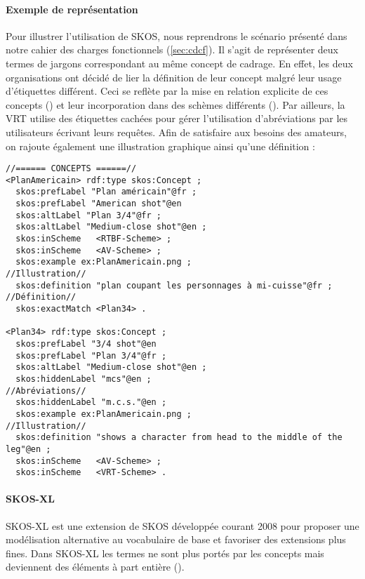 \paragraph{Exemple de représentation} 
Pour illustrer l'utilisation de SKOS, nous reprendrons le scénario présenté dans notre cahier des charges fonctionnels (\ref{sec:cdcf}). 
Il s'agit de représenter deux termes de jargons correspondant au même concept de cadrage.
En effet, les deux organisations ont décidé de lier la définition de leur concept malgré leur usage d'étiquettes différent. 
Ceci se reflète par la mise en relation explicite de ces concepts () et leur incorporation dans des schèmes différents ().
Par ailleurs, la VRT utilise des étiquettes cachées pour gérer l'utilisation d'abréviations par les utilisateurs écrivant leurs requêtes. 
Afin de satisfaire aux besoins des amateurs, on rajoute également une illustration graphique ainsi qu'une définition :
\begin{Verbatim}[fontsize=\small,formatcom=\color{black!70}]
//====== CONCEPTS ======//
<PlanAmericain> rdf:type skos:Concept ; 
  skos:prefLabel "Plan américain"@fr ;
  skos:prefLabel "American shot"@en
  skos:altLabel "Plan 3/4"@fr ;
  skos:altLabel "Medium-close shot"@en ;
  skos:inScheme   <RTBF-Scheme> ;
  skos:inScheme   <AV-Scheme> ;
  skos:example ex:PlanAmericain.png ;                               //Illustration//
  skos:definition "plan coupant les personnages à mi-cuisse"@fr ;   //Définition//
  skos:exactMatch <Plan34> .
   
<Plan34> rdf:type skos:Concept ;
  skos:prefLabel "3/4 shot"@en
  skos:prefLabel "Plan 3/4"@fr ;
  skos:altLabel "Medium-close shot"@en ;
  skos:hiddenLabel "mcs"@en ;                                           //Abréviations//
  skos:hiddenLabel "m.c.s."@en ;
  skos:example ex:PlanAmericain.png ;                                   //Illustration//
  skos:definition "shows a character from head to the middle of the leg"@en ;
  skos:inScheme   <AV-Scheme> ;
  skos:inScheme   <VRT-Scheme> .
\end{Verbatim}



\paragraph{SKOS-XL}\label{sec:skos-xl}
SKOS-XL est une extension de SKOS développée courant 2008 pour proposer une modélisation alternative au vocabulaire de base et favoriser des extensions plus fines. 
Dans SKOS-XL les termes ne sont plus portés par les concepts mais deviennent des éléments à part entière (). 

